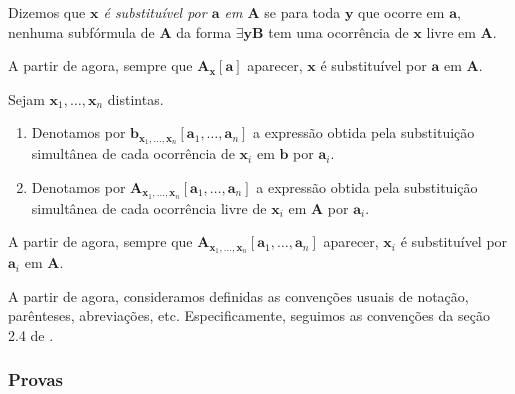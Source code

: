 \begin{definition}
    Dizemos que \emph{$\mathbf{x}$ é substituível por $\mathbf{a}$ em $\mathbf{A}$} se para toda $\mathbf{y}$ que ocorre em $\mathbf{a}$, nenhuma subfórmula de $\mathbf{A}$ da forma $\exists \mathbf{y} \mathbf{B}$ tem uma ocorrência de $\mathbf{x}$ livre em $\mathbf{A}$.
\end{definition}

\begin{remark}
    A partir de agora, sempre que $\mathbf{A}_{\mathbf{x}}[\mathbf{a}]$ aparecer, $\mathbf{x}$ é substituível por $\mathbf{a}$ em $\mathbf{A}$.
\end{remark}

\begin{definition}
    Sejam $\mathbf{x}_1, \ldots, \mathbf{x}_n$ distintas.
        \begin{enumerate}[leftmargin=*, align=left, label=\textbf{(\alph*)}]
            \item Denotamos por $\mathbf{b}_{\mathbf{x}_1, \ldots, \mathbf{x}_n}[\mathbf{a}_1, \ldots, \mathbf{a}_n]$ a expressão obtida pela substituição simultânea de cada ocorrência de $\mathbf{x}_i$ em $\mathbf{b}$ por $\mathbf{a}_i$.
            \item Denotamos por $\mathbf{A}_{\mathbf{x}_1, \ldots, \mathbf{x}_n}[\mathbf{a}_1, \ldots, \mathbf{a}_n]$ a expressão obtida pela substituição simultânea de cada ocorrência livre de $\mathbf{x}_i$ em $\mathbf{A}$ por $\mathbf{a}_i$.
        \end{enumerate}
\end{definition}

\begin{remark}
    A partir de agora, sempre que $\mathbf{A}_{\mathbf{x}_1, \ldots, \mathbf{x}_n}[\mathbf{a}_1, \ldots, \mathbf{a}_n]$ aparecer, $\mathbf{x}_i$ é substituível por $\mathbf{a}_i$ em $\mathbf{A}$.
\end{remark}

\begin{remark}
    A partir de agora, consideramos definidas as convenções usuais de notação, parênteses, abreviações, etc. Especificamente, seguimos as convenções da seção 2.4 de \cite{shoenfield1967}.
\end{remark}

\subsubsection*{Provas}

